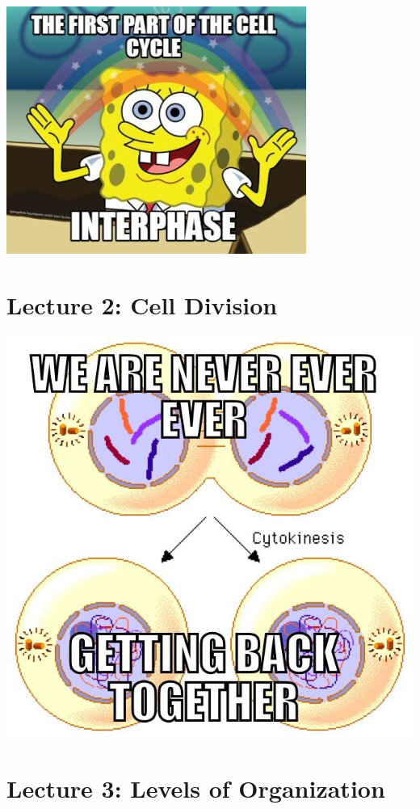 \documentclass[
]{book}
\begin{document}
\includegraphics{./img/l1.jpg}

\hypertarget{lecture-2-cell-division}{%
\section{Lecture 2: Cell Division}\label{lecture-2-cell-division}}

\includegraphics{./img/l2.jpg}

\hypertarget{lecture-3-levels-of-organization}{%
\section{Lecture 3: Levels of Organization}\label{lecture-3-levels-of-organization}}
\end{document}
